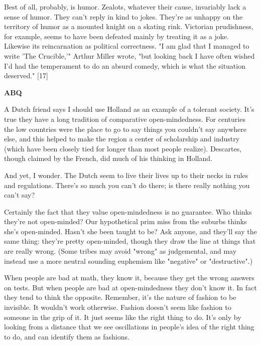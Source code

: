 Best of all,
                  probably, is humor. Zealots, whatever their cause, invariably
                  lack a sense of humor. They can't reply in kind to jokes.
                  They're as unhappy on the territory of humor as a mounted
                  knight on a skating rink. Victorian prudishness, for example,
                  seems to have been defeated mainly by treating it as a joke.
                  Likewise its reincarnation as political correctness. "I am
                  glad that I managed to write 'The Crucible,'" Arthur Miller
                  wrote, "but looking back I have often wished I'd had the
                  temperament to do an absurd comedy, which is what the
                  situation deserved." [17]

\textbf{ABQ}

A
                  Dutch friend says I should use Holland as an example of a
                  tolerant society. It's true they have a long tradition of
                  comparative open-mindedness. For centuries the low countries
                  were the place to go to say things you couldn't say anywhere
                  else, and this helped to make the region a center of
                  scholarship and industry (which have been closely tied for
                  longer than most people realize). Descartes, though claimed by
                  the French, did much of his thinking in Holland.

And
                  yet, I wonder. The Dutch seem to live their lives up to their
                  necks in rules and regulations. There's so much you can't do
                  there; is there really nothing you can't say?

Certainly
                  the fact that they value open-mindedness is no guarantee. Who
                  thinks they're not open-minded? Our hypothetical prim miss
                  from the suburbs thinks she's open-minded. Hasn't she been
                  taught to be? Ask anyone, and they'll say the same thing:
                  they're pretty open-minded, though they draw the line at
                  things that are really wrong. (Some tribes may avoid "wrong"
                  as judgemental, and may instead use a more neutral sounding
                  euphemism like "negative" or "destructive".)

When
                  people are bad at math, they know it, because they get the
                  wrong answers on tests. But when people are bad at
                  open-mindedness they don't know it. In fact they tend to think
                  the opposite. Remember, it's the nature of fashion to be
                  invisible. It wouldn't work otherwise. Fashion doesn't seem
                  like fashion to someone in the grip of it. It just seems like
                  the right thing to do. It's only by looking from a distance
                  that we see oscillations in people's idea of the right thing
                  to do, and can identify them as fashions.

